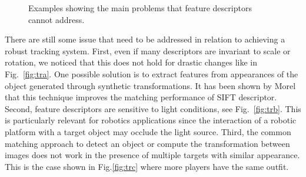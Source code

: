 \begin{figure}[!htb]
	\vspace{2mm}
\centerline{%
	}
	\vspace{-2mm}
\caption{Examples showing the main problems that feature descriptors cannot address. }
\label{fig:tracking_results_scale}
\end{figure} 


There are still some issue that need to be addressed in relation to achieving a robust tracking system. First, even if many descriptors are invariant to scale or rotation, we noticed that this does
not hold for drastic changes like in Fig.~\ref{fig:tra}. One possible solution is to extract features from appearances of the object generated through synthetic transformations. It has been shown by Morel \cite{morel2009} that this technique improves the matching performance of SIFT descriptor.  
Second, feature descriptors are sensitive to light conditions, see Fig.~\ref{fig:trb}. This is particularly relevant for robotics applications since the interaction of a robotic platform with a target object may occlude the light source. Third, the common matching approach to detect an object or compute the transformation between images \cite{mikolajczyk05} does not work in the presence of multiple targets with similar appearance. This is the case shown in Fig.\ref{fig:trc} where more players have the same outfit.



